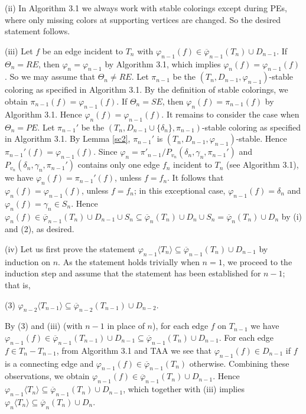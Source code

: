 \documentclass[11pt]{article}
\newcommand{\phibar}{\overline{\varphi}}
\newcommand{\phiv}{\varphi}
\begin{document}
(ii) In Algorithm 3.1 we always work with stable colorings except during PEs, where only missing colors at supporting vertices are changed. So the desired
statement follows.
 
(iii) Let $f$ be an edge incident to $T_n$ with $\varphi_{n-1}(f) \in \phibar_{n-1}(T_n)\cup D_{n-1}$. 
If $\Theta_n=RE$, then $\varphi_n=\varphi_{n-1}$ by Algorithm 3.1, which implies $\phiv_n(f) = 
\phiv_{n-1}(f)$. So we may assume that $\Theta_n\ne RE$. Let $\pi_{n-1}$ be the $(T_n, D_{n-1}, \phiv_{n-1})$-stable 
coloring as specified in Algorithm 3.1. By the definition of stable colorings, we obtain $\pi_{n-1}(f) = 
\phiv_{n-1}(f)$. If $\Theta_n=SE$, then $\phiv_n(f)=  \pi_{n-1}(f)$ by Algorithm 3.1. Hence $\phiv_n(f) 
= \phiv_{n-1}(f)$. It remains to consider the case when $\Theta_n=PE$. Let $\pi_{n-1}'$ be the $(T_n, D_{n-1} 
\cup\{\delta_n\}, \pi_{n-1})$-stable coloring as specified in Algorithm 3.1. By Lemma \ref{sc2}, 
$\pi_{n-1}'$ is $(T_n, D_{n-1}, \phiv_{n-1})$-stable. Hence $\pi_{n-1}'(f) = \phiv_{n-1}(f)$. Since $\phiv_n = \pi'_{n-1}/P_{v_n}(\delta_n, \gamma_n, \pi_{n-1}')$ and $P_{v_n}(\delta_n, \gamma_n, \pi_{n-1}')$ contains only one edge $f_n$ incident to $T_n$ (see Algorithm 3.1), we have $\phiv_n(f) = \pi_{n-1}'(f)$, unless $f=f_n$. 
It follows that $\phiv_n(f) = \phiv_{n-1}(f)$, unless $f=f_n$; in this exceptional case, $\varphi_{n-1}(f)=\delta_n$ and $\varphi_{n}(f) = \gamma_n \in S_n$. Hence $\varphi_{n}(f) \in \phibar_{n-1}(T_n)\cup D_{n-1} \cup S_n \subseteq 
\phibar_{n}(T_n)\cup D_n \cup S_n =\phibar_{n}(T_n)\cup D_n$ by (i) and (2), as desired. 

(iv) Let us first prove the statement $\varphi_{n-1} \langle T_n \rangle \subseteq \phibar_{n-1}(T_n)\cup D_{n-1}$
by induction on $n$. As the statement holds trivially when $n=1$, we proceed to the induction step and assume
that the statement has been established for $n-1$; that is,  

(3) $\varphi_{n-2} \langle T_{n-1} \rangle \subseteq \phibar_{n-2}(T_{n-1})\cup D_{n-2}$.  

By (3) and (iii) (with $n-1$ in place of $n$), for each edge $f$ on $T_{n-1}$ we have $\varphi_{n-1}(f) \in  
\phibar_{n-1}(T_{n-1}) \cup D_{n-1} \subseteq \phibar_{n-1}(T_n)\cup D_{n-1}$.  For each edge $f \in T_n-T_{n-1}$, from 
Algorithm 3.1 and TAA we see that $\varphi_{n-1}(f) \in D_{n-1}$ if $f$ is a connecting edge and $\varphi_{n-1}(f) \in \phibar_{n-1}(T_n)$ otherwise. Combining these observations, we obtain $\varphi_{n-1}(f) \in \phibar_{n-1}(T_n)\cup D_{n-1}$. 
Hence $\varphi_{n-1} \langle T_n \rangle \subseteq \phibar_{n-1}(T_n)\cup D_{n-1}$, which together
with (iii) implies $\varphi_n \langle T_n \rangle \subseteq \phibar_n(T_n)\cup D_n$.  
\end{document}
